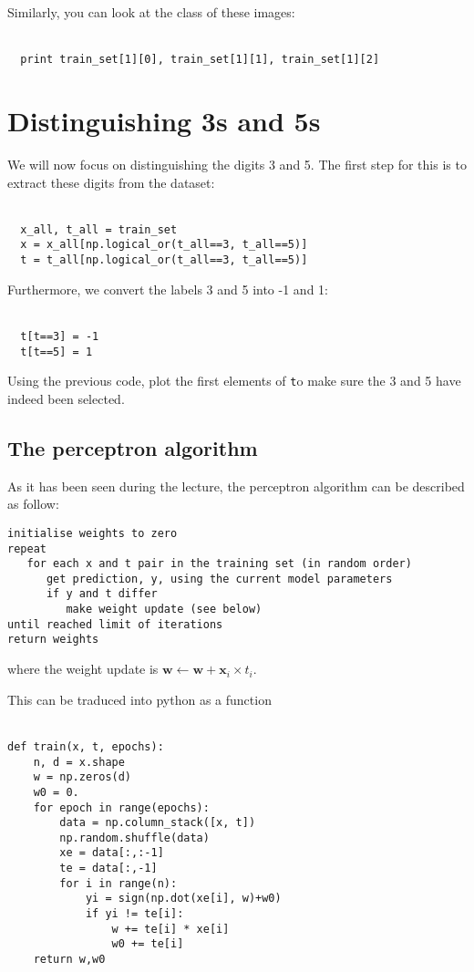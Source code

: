 \documentclass{article}
\newcommand{\mintinline}[1]{\colorbox{bg}{\lstinline[basicstyle=\ttfamily]{#1}}}
\begin{document}
Similarly, you can look at the class of these images:\\ \ 
\begin{verbatim}
  print train_set[1][0], train_set[1][1], train_set[1][2]
\end{verbatim}

\section{Distinguishing 3s and 5s}
We will now focus on distinguishing the digits 3 and 5. The first step for this is to extract these digits from the dataset:\\ \ \\
\begin{verbatim}
  x_all, t_all = train_set
  x = x_all[np.logical_or(t_all==3, t_all==5)]
  t = t_all[np.logical_or(t_all==3, t_all==5)]
\end{verbatim}

Furthermore, we convert the labels 3 and 5 into -1 and 1:\\ \ \\
\begin{verbatim}
  t[t==3] = -1
  t[t==5] = 1
\end{verbatim}

Using the previous code, plot the first elements of \texttt to make sure the 3 and 5 have indeed been selected.

\subsection{The perceptron algorithm}
As it has been seen during the lecture, the perceptron algorithm can be described as follow:
\begin{lstlisting}
initialise weights to zero 
repeat
   for each x and t pair in the training set (in random order)  
      get prediction, y, using the current model parameters 
      if y and t differ
         make weight update (see below) 
until reached limit of iterations
return weights
\end{lstlisting}
where the weight update is $\mathbf{w} \leftarrow \mathbf{w} + \mathbf{x}_i \times t_i$.

This can be traduced into python as a function\\ \ \\
\begin{verbatim}
def train(x, t, epochs):
    n, d = x.shape
    w = np.zeros(d)
    w0 = 0.
    for epoch in range(epochs):
        data = np.column_stack([x, t])
        np.random.shuffle(data)
        xe = data[:,:-1]
        te = data[:,-1]
        for i in range(n):
            yi = sign(np.dot(xe[i], w)+w0)
            if yi != te[i]:
                w += te[i] * xe[i]
                w0 += te[i] 
    return w,w0

\end{verbatim}
\end{document}
